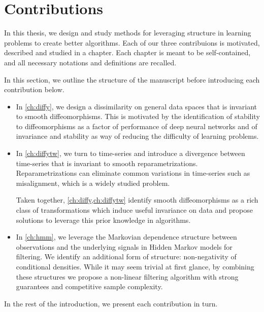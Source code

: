 \section{Contributions}

In this thesis, we design and study methods for leveraging structure in learning problems to create better algorithms.
Each of our three contribuions is motivated, described and studied in a chapter. Each chapter is meant to be self-contained, and all necessary notations and definitions are recalled.

In this section, we outline the structure of the manuscript before introducing each contribution below.

\begin{itemize}
\item In \cref{ch:diffy}, we design a dissimilarity on general data spaces that is invariant to smooth diffeomorphisms. This is motivated by the identification of stability to diffeomorphisms as a factor of performance of deep neural networks and of invariance and stability as way of reducing the difficulty of learning problems.

\item In \cref{ch:diffytw}, we turn to time-series and introduce a divergence between time-series that is invariant to smooth reparametrizations. Reparametrizations can eliminate common variations in time-series such as misalignment, which is a widely studied problem.

\medskip

Taken together, \cref{ch:diffy,ch:diffytw} identify smooth diffeomorphisms as a rich class of transformations which induce useful invariance on data and propose solutions to leverage this prior knowledge in algorithms.

\item  In \cref{ch:hmm}, we leverage the Markovian dependence structure between observations and the underlying signals in Hidden Markov models for filtering. We identify an additional form of structure: non-negativity of conditional densities. While it may seem trivial at first glance, by combining these structures we propose a non-linear filtering algorithm with strong guarantees and competitive sample complexity.
\end{itemize}

\noindent In the rest of the introduction, we present each contribution in turn.

